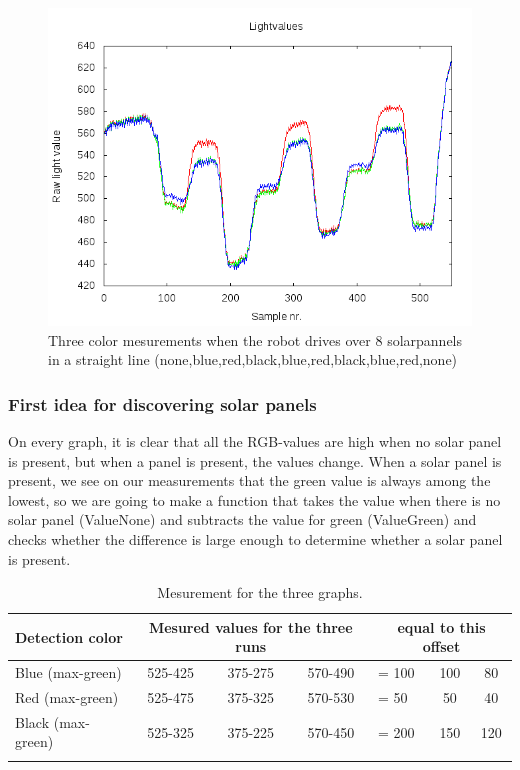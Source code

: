 \begin{figure}[hbt]
  \includegraphics[scale=0.35]{../experiments/2prototype/results/gnuplot/Colormesrun3.png}
  \caption{Three color mesurements when the robot drives over 8 solarpannels in a
straight line (none,blue,red,black,blue,red,black,blue,red,none)}
\end{figure}
\subsubsection{First idea for discovering solar panels}

On every graph, it is clear that all the RGB-values are high when no
solar panel is present, but when a panel is present, the values change.
When a solar panel is present, we see on our measurements that the green
value is always among the lowest, so we are going to make a function
that takes the value when there is no solar panel (ValueNone) and
subtracts the value for green (ValueGreen) and checks whether the
difference is large enough to determine whether a solar panel is
present.


\begin{longtable}[chtp]{|l|c|c|c|l|c|c|}
\hline
Detection color & 
\multicolumn{3}{c|}{Mesured values for the three runs} &
\multicolumn{3}{c|}{equal to this offset}\\\hline 
Blue (max-green) & 525-425 & 375-275 & 570-490 &= 100 & 100 & 80 \\
Red (max-green)  & 525-475 & 375-325 & 570-530 &=  50 &  50 & 40 \\
Black (max-green)& 525-325 & 375-225 & 570-450 &= 200 & 150 &120\\
\hline
\caption{Mesurement for the three graphs.}
\end{longtable}


